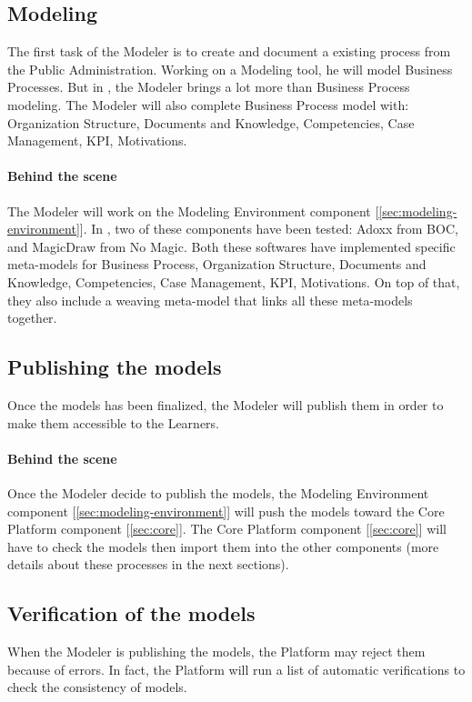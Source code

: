 \documentclass{learnpad}
\begin{document}
\subsection{Modeling}
The first task of the Modeler is to create and document a existing process from
the Public Administration.  Working on a Modeling tool, he will model Business
Processes.  But in \learnpad, the Modeler brings a lot more than Business
Process modeling.  The Modeler will also complete Business Process model with:
Organization Structure, Documents and Knowledge, Competencies, Case Management,
KPI, Motivations.

\paragraph{Behind the scene}
The Modeler will work on the Modeling Environment component
[\ref{sec:modeling-environment}].  In \learnpad, two of these components have
been tested: Adoxx from BOC, and MagicDraw from No Magic.  Both these softwares
have implemented specific meta-models for Business Process, Organization
Structure, Documents and Knowledge, Competencies, Case Management, KPI,
Motivations.  On top of that, they also include a weaving meta-model that links
all these meta-models together.

\subsection{Publishing the models}\label{sse:PublishingModels}
Once the models has been finalized, the Modeler will publish them in order to
make them accessible to the Learners.

\paragraph{Behind the scene}
Once the Modeler decide to publish the models, the Modeling Environment
component [\ref{sec:modeling-environment}] will push the models toward the
\learnpad Core Platform component [\ref{sec:core}].  The \learnpad Core Platform
component [\ref{sec:core}] will have to check the models then import them into
the other components (more details about these processes in the next sections).

\subsection{Verification of the models}
When the Modeler is publishing the models, the \learnpad Platform may reject
them because of errors.  In fact, the \learnpad Platform will run a list of
automatic verifications to check the consistency of models.
\end{document}
